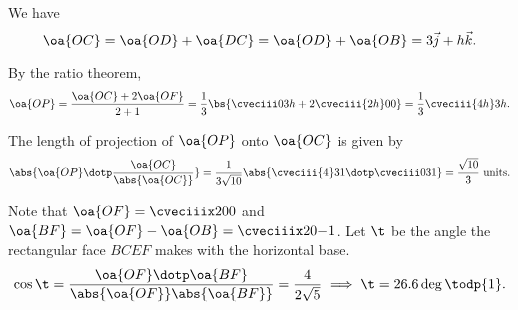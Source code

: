 \begin{solution}
    \begin{ppart}
        We have \[\oa{OC} = \oa{OD} + \oa{DC} = \oa{OD} + \oa{OB} = 3 \vec j + h \vec k.\]
    \end{ppart}
    \begin{ppart}
        By the ratio theorem, \[\oa{OP} = \frac{\oa{OC} + 2 \oa{OF}}{2 + 1} = \frac13 \bs{\cveciii03h + 2\cveciii{2h}00 } = \frac13 \cveciii{4h}3h.\]
    \end{ppart}
    \begin{ppart}
        The length of projection of $\oa{OP}$ onto $\oa{OC}$ is given by \[\abs{\oa{OP} \dotp \frac{\oa{OC}}{\abs{\oa{OC}}}} = \frac1{3\sqrt{10}} \abs{\cveciii{4}31 \dotp \cveciii031} = \frac{\sqrt{10}}3 \text{ units}.\]
    \end{ppart}
    \begin{ppart}
        Note that $\oa{OF} = \cveciiix200$ and $\oa{BF} = \oa{OF} - \oa{OB} = \cveciiix20{-1}$. Let $\t$ be the angle the rectangular face $BCEF$ makes with the horizontal base. \[\cos \t = \frac{\oa{OF} \dotp \oa{BF}}{\abs{\oa{OF}}\abs{\oa{BF}}} = \frac{4}{2\sqrt5} \implies \t = 26.6 \deg \todp{1}.\]
    \end{ppart}
\end{solution}


